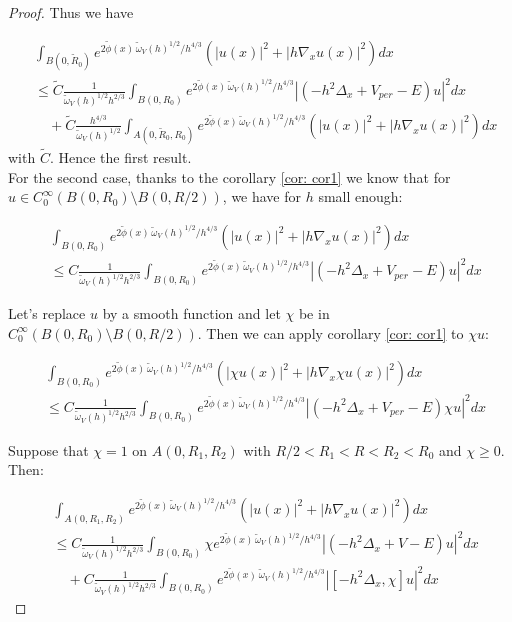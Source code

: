 \documentclass[10pt,a4paper]{amsart}
\newcommand{\nn}{\nonumber}
\begin{document}
\begin{proof}
Thus we have

\begin{align}
    &\int_{B(0,\tilde{R}_0)} e^{2\tilde{\phi}(x)\,\tilde{\omega}_V(h)^{1/2}/ h^{4/3}} (|u(x)|^2 +|h\nabla_x u(x)|^2)dx\nn\\
    &\leq \tilde{C} \frac{1}{\tilde{\omega}_V(h)^{1/2}h^{2/3}}\int_{B(0,R_0)} e^{2\tilde{\phi}(x)\,\tilde{\omega}_V(h)^{1/2}/ h^{4/3}}|(-h^2\Delta_x + V_{per}- E)u|^2dx\nn\\
    &\quad +\tilde{C} \frac{h^{4/3}}{\tilde{\omega}_V(h)^{1/2}}\int_{A(0,\tilde{R}_0,R_0)} e^{2\tilde{\phi}(x)\,\tilde{\omega}_V(h)^{1/2}/ h^{4/3}} (|u(x)|^2 +|h\nabla_x u(x)|^2)dx
\end{align}
with $\tilde{C}$. Hence the first result.\\
For the second case, thanks to the corollary \ref{cor: cor1} we know that for $u \in C_0^\infty(B(0,R_0)\setminus B(0,R/2))$, we have for $h$ small enough:

\begin{align}
    &\int_{B(0,R_0)} e^{2\tilde{\phi}(x)\,\tilde{\omega}_V(h)^{1/2}/ h^{4/3}} (|u(x)|^2 +|h\nabla_x u(x)|^2)dx\nn\\
    &\leq C \frac{1}{\tilde{\omega}_V(h)^{1/2}h^{2/3}}\int_{B(0,R_0)} e^{2\tilde{\phi}(x)\,\tilde{\omega}_V(h)^{1/2}/ h^{4/3}}|(-h^2\Delta_x + V_{per}- E)u|^2dx
\end{align}

Let's replace $u$ by a smooth function and let $\chi$ be in $ C_0^\infty(B(0,R_0)\setminus B(0,R/2))$. Then we can apply corollary \ref{cor: cor1} to $\chi u$:

\begin{align}
    &\int_{B(0,R_0)} e^{2\tilde{\phi}(x)\,\tilde{\omega}_V(h)^{1/2}/ h^{4/3}} (|\chi u(x)|^2 +|h\nabla_x \chi u(x)|^2)dx\nn\\
    &\leq C \frac{1}{\tilde{\omega}_V(h)^{1/2}h^{2/3}}\int_{B(0,R_0)} e^{2\tilde{\phi}(x)\,\tilde{\omega}_V(h)^{1/2}/ h^{4/3}}|(-h^2\Delta_x + V_{per}- E)\chi u|^2dx
\end{align}

Suppose that $\chi=1$ on $A(0,R_1,R_2)$ with $R/2<R_1<R<R_2<R_0$ and $\chi\geq 0$. Then:

\begin{align}
    &\int_{A(0,R_1,R_2)} e^{2\tilde{\phi}(x)\,\tilde{\omega}_V(h)^{1/2}/ h^{4/3}} ( |u(x)|^2 +|h\nabla_x u(x)|^2)dx\nn\\
    &\leq C \frac{1}{\tilde{\omega}_V(h)^{1/2}h^{2/3}}\int_{B(0,R_0)} \chi e^{2\tilde{\phi}(x)\,\tilde{\omega}_V(h)^{1/2}/ h^{4/3}}|(-h^2\Delta_x + V- E) u|^2dx\nn\\
    &\quad + C \frac{1}{\tilde{\omega}_V(h)^{1/2}h^{2/3}}\int_{B(0,R_0)} e^{2\tilde{\phi}(x)\,\tilde{\omega}_V(h)^{1/2}/ h^{4/3}}|[-h^2\Delta_x ,\chi] u|^2dx
\end{align}


\end{proof}
\end{document}
